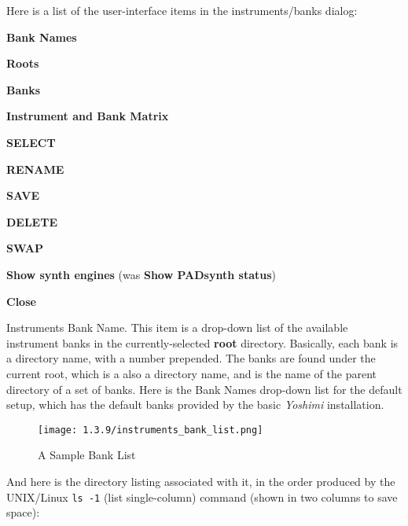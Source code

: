 
   Here is a list of the user-interface items in the instruments/banks dialog:

   \begin{enumber}
      \item \textbf{Bank Names}
      \item \textbf{Roots}
      \item \textbf{Banks}
      \item \textbf{Instrument and Bank Matrix}
      \item \textbf{SELECT}
      \item \textbf{RENAME}
      \item \textbf{SAVE}
      \item \textbf{DELETE}
      \item \textbf{SWAP}
      \item \textbf{Show synth engines}
         (was \textbf{Show PADsynth status})
      \item \textbf{Close}
   \end{enumber}

   \setcounter{ItemCounter}{0}      %

   Instruments Bank Name.
   This item is a drop-down list of the available instrument banks in the
   currently-selected \textbf{root} directory.
   Basically, each bank is a directory name, with a number prepended.
   The banks are found under the current root, which is a also a directory
   name, and is the name of the parent directory of a set of banks.
   Here is the Bank Names drop-down list for the default setup, which has the
   default banks provided by the basic \textsl{Yoshimi} installation.

\begin{figure}[H]
   \centering 
   \texttt{[image: 1.3.9/instruments\_bank\_list.png]}
   \caption[A Sample Bank List]{A Sample Bank List}
   \label{fig:bank_list}
\end{figure}

   And here is the directory listing associated with it, in the order
   produced by the UNIX/Linux \texttt{ls -1}
   (list single-column) command (shown in
   two columns to save space):

